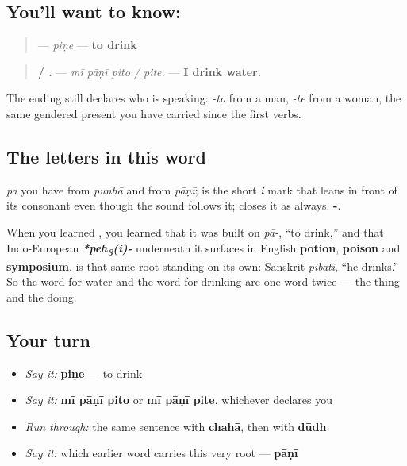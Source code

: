 \subsection*{You'll want to know: }
\begin{quote}
\textbf{} — \emph{piṇe} — \textbf{to drink}
\end{quote}

\begin{quote}
\textbf{   / .} — \emph{mī pāṇī pito / pite.} — \textbf{I drink water.}
\end{quote}

The ending still declares who is speaking: \emph{-to} from a man, \emph{-te} from a woman, the same gendered present you have carried since the first verbs.

\subsection*{The letters in this word}
\textbf{} \emph{pa} you have from \emph{punhā} and from \emph{pāṇī}; \textbf{} is the short \emph{i} mark that leans in front of its consonant even though the sound follows it; \textbf{} closes it as always. \textbf{-}.

\begin{cousinweb}
When you learned \textbf{}, you learned that it was built on \textbf{} \emph{pā-}, \textquotedblleft{}to drink,\textquotedblright{} and that Indo-European \emph{\textbf{*peh\textsubscript{3}(i)-}} underneath it surfaces in English \textbf{potion}, \textbf{poison} and \textbf{symposium}. \textbf{} is that same root standing on its own: Sanskrit \textbf{} \emph{pibati}, \textquotedblleft{}he drinks.\textquotedblright{} So the word for water and the word for drinking are one word twice — the thing and the doing.
\end{cousinweb}

\subsection*{Your turn}
\begin{itemize}
\raggedright
  \item \emph{Say it:} \textbf{piṇe} — to drink
  \item \emph{Say it:} \textbf{mī pāṇī pito} or \textbf{mī pāṇī pite}, whichever declares you
  \item \emph{Run through:} the same sentence with \textbf{chahā}, then with \textbf{dūdh}
  \item \emph{Say it:} which earlier word carries this very root — \textbf{pāṇī}
\end{itemize}

